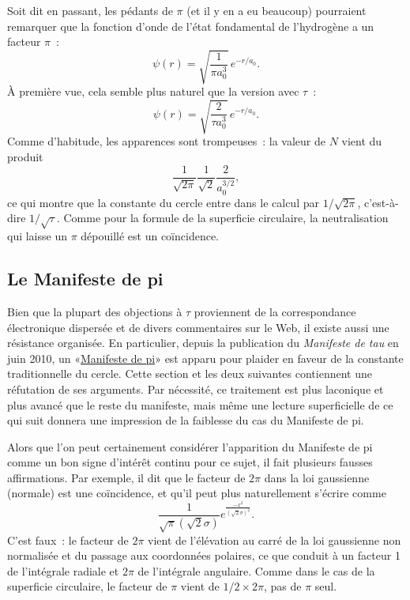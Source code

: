 Soit dit en passant, les pédants de $\pi$ (et il y en a eu beaucoup) pourraient
remarquer que la fonction d'onde de l'état fondamental de l'hydrogène a un
facteur $\pi$~:
\[
\psi(r) = \sqrt{\frac{1}{\pi a_0^3}}\,e^{-r/a_0}.
\]
À première vue, cela semble plus naturel que la version avec $\tau$~:
\[
\psi(r) = \sqrt{\frac{2}{\tau a_0^3}}\,e^{-r/a_0}.
\]
Comme d'habitude, les apparences sont trompeuses~: la valeur de $N$ vient du
produit
\[
\frac{1}{\sqrt{2\pi}} \frac{1}{\sqrt{2}} \frac{2}{a_0^{3/2}},
\]
ce qui montre que la constante du cercle entre dans le calcul par
$1/\sqrt{2\pi}$, c'est-à-dire $1/\sqrt{\tau}$. Comme pour la formule de la
superficie circulaire, la neutralisation qui laisse un $\pi$ dépouillé est un
coïncidence.


  \subsection{Le Manifeste de pi} %
  \label{sec:the_pi_manifesto_a_rebuttal}

Bien que la plupart des objections à $\tau$ proviennent de la correspondance
électronique dispersée et de divers commentaires sur le Web, il existe aussi une
résistance organisée. En particulier, depuis la publication du \emph{Manifeste
de tau} en juin 2010, un «\ns \href{http://thepimanifesto.com/}{Manifeste de
pi}\ns » est apparu pour plaider en faveur de la constante traditionnelle du
cercle. Cette section et les deux suivantes contiennent une réfutation de ses
arguments. Par nécessité, ce traitement est plus laconique et plus avancé que le
reste du manifeste, mais même une lecture superficielle de ce qui suit donnera
une impression de la faiblesse du cas du Manifeste de pi.

Alors que l'on peut certainement considérer l'apparition du Manifeste de pi
comme un bon signe d'intérêt continu pour ce sujet, il fait plusieurs fausses
affirmations. Par exemple, il dit que le facteur de $2\pi$ dans la loi
gaussienne (normale) est une coïncidence, et qu'il peut plus naturellement
s'écrire comme
\[
\frac{1}{\sqrt\pi(\sqrt 2\sigma)}e^{\frac{-x^2}{(\sqrt 2\sigma)^2}}.
\]
C'est faux~: le facteur de $2\pi$ vient de l'élévation au carré de la loi
gaussienne non normalisée et du passage aux coordonnées polaires, ce que conduit
à un facteur 1 de l'intégrale radiale et $2\pi$ de l'intégrale angulaire. Comme
dans le cas de la superficie circulaire, le facteur de $\pi$ vient de $1/2\times
2\pi$, pas de $\pi$ seul.

